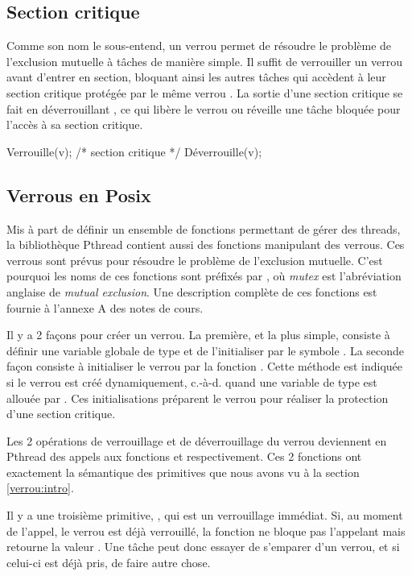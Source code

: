 \subsection{Section critique}
Comme son nom le sous-entend, un verrou permet de résoudre le problème de l'exclusion mutuelle à  tâches de manière simple. Il suffit de verrouiller un verrou  avant d'entrer en section, bloquant ainsi les autres tâches qui accèdent à leur section critique protégée par le même verrou . La sortie d'une section critique se fait en déverrouillant , ce qui libère le verrou ou réveille une tâche bloquée pour l'accès à sa section critique.

\begin{codeblock}
Verrouille(v);
/* section critique */
Déverrouille(v);
\end{codeblock}


\subsection{Verrous en Posix}
Mis à part de définir un ensemble de fonctions permettant de gérer des threads, la bibliothèque Pthread contient aussi des fonctions manipulant des verrous.
Ces verrous sont prévus pour résoudre le problème de l'exclusion mutuelle. C'est pourquoi les noms de ces fonctions sont préfixés par , où {\em mutex} est l'abréviation anglaise de {\em mutual exclusion}. Une description complète de ces fonctions est fournie à l'annexe A des notes de cours.

Il y a 2 façons pour créer un verrou. La première, et la plus simple, consiste à définir une variable globale de type  et de l'initialiser par le symbole . La seconde façon consiste à initialiser le verrou par la fonction . Cette méthode est indiquée si le verrou est créé dynamiquement, c.-à-d. quand une variable de type  est allouée par . Ces initialisations préparent le verrou pour réaliser la protection d'une section critique.

Les 2 opérations de verrouillage et de déverrouillage du verrou deviennent en Pthread des appels aux fonctions  et  respectivement. Ces 2 fonctions ont exactement la sémantique des primitives que nous avons vu à la section \ref{verrou:intro}.

Il y a une troisième primitive, , qui est un verrouillage immédiat. Si, au moment de l'appel, le verrou est déjà verrouillé, la fonction ne bloque pas l'appelant mais retourne la valeur . Une tâche peut donc essayer de s'emparer d'un verrou, et si celui-ci est déjà pris, de faire autre chose.

